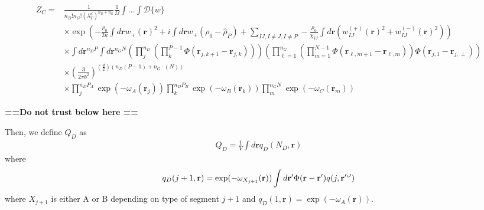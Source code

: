 \documentclass{article}
\begin{document}
  \begin{align*}
    Z_C =& \frac{1}{n_D!n_G! \left( \lambda_T^d \right)^{n_D+n_G}}
      \frac{1}{\Omega}
      \int \hdots \int \mathcal{D} \{w\} \\
      &\times
      \exp \left(
        - \frac{\rho_0}{2\kappa} \int d \mathbf{r} w_+(\mathbf{r})^2
        + i \int d\mathbf{r} w_+ \left(\rho_0 -\hat{\rho}_{P}  \right)
        + \sum_{IJ,I \ne J, I \ne P}
        - \frac{\rho_0}{\chi_{IJ}}
        \int d \mathbf{r}
        \left(
          w_{IJ}^{(+)} (\mathbf{r})^2 + w_{IJ}^{(-)} (\mathbf{r})^2
        \right)
      \right) \\
      &\times \int d \mathbf{r}^{n_D P} \int d \mathbf{r}^{n_G N}
        \left(\prod_j^{n_D} 
        \left( \prod_k^{P-1}
        \Phi(\mathbf{r}_{j,k+1} - \mathbf{r}_{j,k})\right) 
        \right)  
      \left(   \prod_{\ell=1}^{n_G} 
      \left(
        \prod_{m=1}^{N-1}  
        \Phi (\mathbf{r}_{\ell,m+1} - \mathbf{r}_{\ell,m})
        \right)
        \Phi \left(
          \mathbf{r}_{j,1} - \mathbf{r}_{j,\perp}
          \right) 
        \right) 
          \\ 
      & \times  
      \left( \frac{3}{2\pi b^2} \right) 
      ^ {(\frac{d}{2}) (n_D (P-1) + n_G \cdot (N ))  }
      \\
      &\times
      \prod_{j}^{n_{D}P_{A}}
      \exp \left( -\omega_A(\mathbf{r}_j) \right)
      \prod_{k}^{n_{D}P_{B}}
      \exp \left( -\omega_B(\mathbf{r}_k) \right)
      \prod_{m}^{n_{G}N_{}}
      \exp \left( -\omega_C(\mathbf{r}_m) \right)
  \end{align*}
  
  \textbf{==Do not trust below here ==}
  
  Then, we define $Q_D$ as
  \begin{align*}
    Q_D = \frac{1}{V} \int d\mathbf{r} q_D (N_D, \mathbf{r})
  \end{align*}
  where
  \begin{align*}
    q_D(j+1, \mathbf{r}) = \exp(-\omega_{X_{j+1}}(\mathbf{r}))
      \int d \mathbf{r}^\prime \Phi(\mathbf{r} - \mathbf{r}^\prime)
      q(j, \mathbf{r}'`')  
  \end{align*}
  where $X_{j+1}$ is either A or B depending on type of segment $j+1$
    and $q_D(1, \mathbf{r}) = \exp(-\omega_A(\mathbf{r}))$.
  \\
\end{document}
